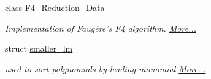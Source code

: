 \begin{DoxyCompactItemize}
class \hyperlink{group___g_b_computation_class_f4___reduction___data}{F4\+\_\+\+Reduction\+\_\+\+Data}
\begin{DoxyCompactList}\small\item\em Implementation of Faug\`{e}re's F4 algorithm.  \hyperlink{group___g_b_computation_class_f4___reduction___data}{More...}\end{DoxyCompactList}\item 
struct \hyperlink{group___g_b_computation_structsmaller__lm}{smaller\+\_\+lm}
\begin{DoxyCompactList}\small\item\em used to sort polynomials by leading monomial  \hyperlink{group___g_b_computation_structsmaller__lm}{More...}\end{DoxyCompactList}\end{DoxyCompactItemize}
